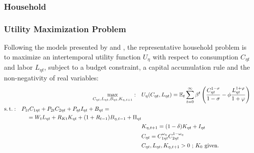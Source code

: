 \documentclass[
thesis.tex
]{subfiles}
\begin{document}



\subsubsection{Household}

\subsubsection*{Utility Maximization Problem}

Following the models presented by \textcite{costa_junior_understanding_2016} and \textcite{solis-garcia_ucb_2022}, the representative household problem is to maximize an intertemporal utility function $U_{\eta}$ with respect to consumption $C_{\eta t}$ and labor $L_{\eta t}$, subject to a budget constraint, a capital accumulation rule and the non-negativity of real variables:
\begin{align}
	\max_{C_{\eta t}, L_{\eta t}, B_{\eta t}, K_{\eta, t+1}}: \quad & U_{\eta}(C_{\eta t},L_{\eta t}) = {\mathbb{E}_{t}} \sum_{t=0}^{\infty} \beta^t \left(\frac{C_{\eta t}^{1-\sigma}}{1-\sigma} - \phi \frac{L_{\eta t}^{1+\varphi}}{1+\varphi} \right) \label{eq:reg-utility-function-0} 
	\\
	\begin{split}
		\operatorname{s.t.}: \quad & P_{1t} C_{1\eta t} + P_{2t} C_{2\eta t} + P_{\eta t} I_{\eta t} + B_{\eta t} = \\ & \quad = W_t L_{\eta t} + R_{Kt} K_{\eta t} + (1 + R_{t-1}) B_{\eta,t-1} + \Pi_{\eta t}
	\end{split} \label{eq:reg-budget-constraint} \\
	\quad & K_{\eta, t+1} = (1-\delta)K_{\eta t} + I_{\eta t} \label{eq:reg-law-of-motion-for-capital} \\
	\quad & C_{\eta t} = C_{1\eta t}^{\omega_{\eta}} C_{2\eta t}^{1-\omega_{\eta}} \label{eq:reg-consumption-aggregation} \\
	\quad & C_{\eta t}, L_{\eta t}, K_{\eta, t+1} > 0 \text{ ; $K_0$ given.} \nonumber
\end{align}
\end{document}
